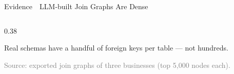 \documentclass[aspectratio=169]{beamer}
\newcommand{\apptitle}[3]{\textcolor{#1}{#2}~\textcolor{black!30}{\textbar}~#3}
\begin{document}
\begin{frame}{\apptitle{tugb}{Evidence}{LLM-built Join Graphs Are Dense}}
\begin{columns}[T]
\begin{column}{0.38\textwidth}
\begin{itemize}
\end{itemize}
\vspace{3mm}
\begin{alertblock}{}
\vspace{0.5mm}
Real schemas have a handful of foreign keys per table --- not hundreds.
\vspace{0.5mm}
\end{alertblock}
\vspace{1mm}
{\tiny\textcolor{gray}{Source: exported join graphs of three businesses (top 5,000 nodes each).}}
\end{column}
\end{columns}
\end{frame}

\iffalse
\end{document}
